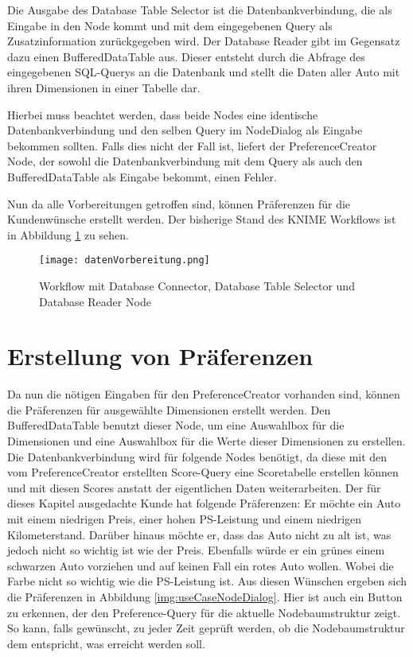 Die Ausgabe des Database Table Selector ist die Datenbankverbindung, die als Eingabe in den Node kommt und mit dem eingegebenen Query als Zusatzinformation zurückgegeben wird. Der Database Reader gibt im Gegensatz dazu einen BufferedDataTable aus. Dieser entsteht durch die Abfrage des eingegebenen SQL-Querys an die Datenbank und stellt die Daten aller Auto mit ihren Dimensionen in einer Tabelle dar. 

Hierbei muss beachtet werden, dass beide Nodes eine identische Datenbankverbindung und den selben Query im NodeDialog als Eingabe bekommen sollten. Falls dies nicht der Fall ist, liefert der PreferenceCreator Node, der sowohl die Datenbankverbindung mit dem Query als auch den BufferedDataTable als Eingabe bekommt, einen Fehler.

Nun da alle Vorbereitungen getroffen sind, können Präferenzen für die Kundenwünsche erstellt werden. Der bisherige Stand des KNIME Workflows ist in Abbildung \ref{img:datenVorbereitung} zu sehen.

\begin{figure}[H]
	\centering
	\texttt{[image: datenVorbereitung.png]}
	\caption{Workflow mit Database Connector, Database Table Selector und Database Reader Node}
	\label{img:datenVorbereitung}
\end{figure} 
\section{Erstellung von Präferenzen}
\label{ch:Evaluierung:sec:createPref}
Da nun die nötigen Eingaben für den PreferenceCreator vorhanden sind, können die Präferenzen für ausgewählte Dimensionen erstellt werden. Den BufferedDataTable benutzt dieser Node, um eine Auswahlbox für die Dimensionen und eine Auswahlbox für die Werte dieser Dimensionen zu erstellen. Die Datenbankverbindung wird für folgende Nodes benötigt, da diese mit den vom PreferenceCreator erstellten Score-Query eine Scoretabelle erstellen können und mit diesen Scores anstatt der eigentlichen Daten weiterarbeiten. 
Der für dieses Kapitel ausgedachte Kunde hat folgende Präferenzen: Er möchte ein Auto mit einem niedrigen Preis, einer hohen PS-Leistung und einem niedrigen Kilometerstand. Darüber hinaus möchte er, dass das Auto nicht zu alt ist, was jedoch nicht so wichtig ist wie der Preis. Ebenfalls würde er ein grünes einem schwarzen Auto vorziehen und auf keinen Fall ein rotes Auto wollen. Wobei die Farbe nicht so wichtig wie die PS-Leistung ist. Aus diesen Wünschen ergeben sich die Präferenzen in Abbildung \ref{img:useCaseNodeDialog}. Hier ist auch ein Button zu erkennen, der den Preference-Query für die aktuelle Nodebaumstruktur zeigt. So kann, falls gewünscht, zu jeder Zeit geprüft werden, ob die Nodebaumstruktur dem entspricht, was erreicht werden soll. 

